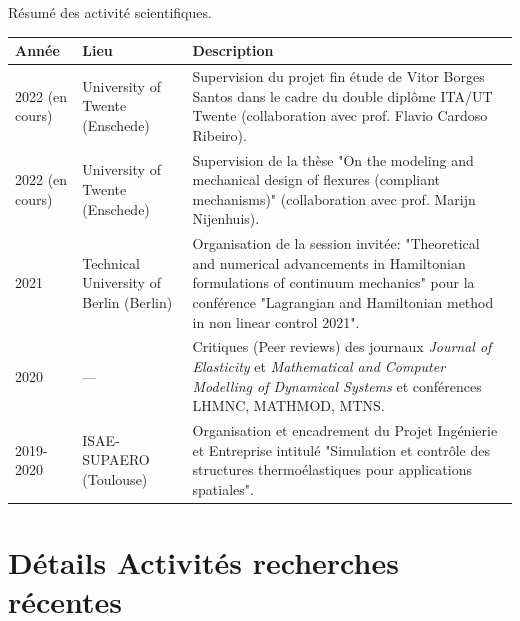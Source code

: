 \documentclass[aspectratio=169, french]{beamer}
\begin{document}
\begin{frame}{Résumé des activité scientifiques.}
	\small
	\begin{table}
		\centering
		\begin{tabular}{p{}p{}p{}}
			\hline
			Année & Lieu & Description  \\
			\hline
			2022 (en cours) & University of Twente (Enschede) & Supervision du projet fin étude de Vitor Borges Santos dans le cadre du double diplôme ITA/UT Twente (collaboration avec prof. Flavio Cardoso Ribeiro). \\
			2022 (en cours) & University of Twente (Enschede) & Supervision de la thèse "On the modeling and mechanical design of flexures (compliant mechanisms)" (collaboration avec prof. Marijn Nijenhuis). \\
			\hline
			2021  & Technical University of Berlin (Berlin) & Organisation de la session invitée: "Theoretical and numerical advancements in Hamiltonian formulations of continuum mechanics" pour la conférence "Lagrangian and Hamiltonian method in non linear control 2021". \\
			\hline
			2020 & --- & Critiques (Peer reviews) des journaux \textit{Journal of Elasticity} et \textit{Mathematical and Computer Modelling of Dynamical Systems} et conférences LHMNC, MATHMOD, MTNS. \\
			\hline
			2019-2020 & ISAE-SUPAERO (Toulouse) & Organisation et encadrement du Projet Ingénierie et Entreprise intitulé "Simulation et contrôle des structures thermoélastiques pour
			applications spatiales". \\
			\hline
		\end{tabular}

		\label{tab:activites}
	\end{table}
\end{frame}

\section{Détails Activités recherches récentes}
\end{document}
